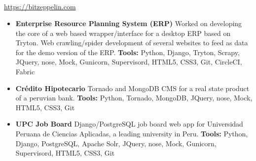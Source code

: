 \documentclass[11pt,a4paper,english]{moderncv}
\begin{document}
\subsection{}

{
\url{https://bitzeppelin.com}
\newline{}
\begin{itemize}
    \item \textbf{Enterprise Resource Planning System (ERP)}
        \newline{}
	    Worked on developing the core of a web based wrapper/interface for a desktop ERP based on Tryton. Web crawling/spider development of several websites to feed as data for the demo version of the ERP.
        \newline{}
        \textbf{Tools:} Python, Django, Tryton, Scrapy, JQuery, nose, Mock, Gunicorn, Supervisord, HTML5, CSS3, Git, CircleCI, Fabric
    \item \textbf{Crédito Hipotecario}
        \newline{}
        Tornado and MongoDB CMS for a real state product of a peruvian bank.
        \newline{}
        \textbf{Tools:} Python, Tornado, MongoDB, JQuery, nose, Mock, HTML5, CSS3, Git
    \item \textbf{UPC Job Board}
        \newline{}
        Django/PostgreSQL job board web app for Universidad Peruana de Ciencias Aplicadas, a leading university in Peru.
        \newline{}
        \textbf{Tools:} Python, Django, PostgreSQL, Apache Solr, JQuery, nose, Mock, Gunicorn, Supervisord, HTML5, CSS3, Git
\end{itemize}
}

\subsection{}
\end{document}
